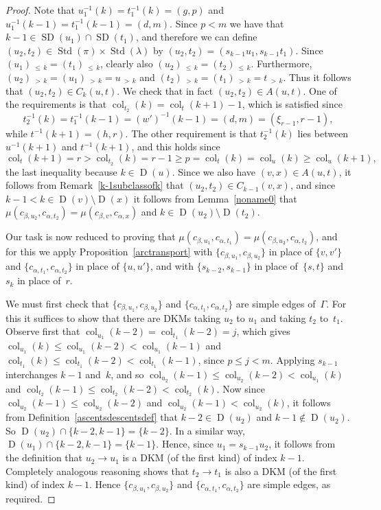 \documentclass[ALCO,ThmDefs,Unicode,epreuves]{cedram}
\DeclareMathOperator{\col}{col}
\newcommand{\morethan}[2]{#1\,{_{>\,#2}}}
\newcommand{\Lessthan}[2]{#1\,{_{\leqslant\,#2}}}
\DeclareMathOperator{\STD}{Std}
\DeclareMathOperator{\SD}{SD}
\DeclareMathOperator{\D}{D}
\begin{document}
\begin{proof}
Note that $u_1^{-1}(k)=t_1^{-1}(k)=(g,p)$ and $u_1^{-1}(k-1)=t_1^{-1}(k-1)=(d,m)$.
Since $p<m$ we have that $k-1\in\SD(u_1)\cap\SD(t_1)$, and therefore we can define
$(u_2,t_2)\in\STD(\pi)\times\STD(\lambda)$ by $(u_2,t_2)=(s_{k-1}u_1,s_{k-1}t_1)$.
Since $\Lessthan{(u_1)}k=\Lessthan{(t_1)}k$, clearly also
$\Lessthan{(u_2)}k=\Lessthan{(t_2)}k$. Furthermore,
$\morethan{(u_2)}k=\morethan{(u_1)}k=\morethan uk$ and
$\morethan{(t_2)}k=\morethan{(t_1)}k=\morethan tk$. Thus it follows that
$(u_2,t_2)\in C_k(u,t)$. We check that in fact $(u_2,t_2)\in A(u,t)$. One of the
requirements is that $\col_{t_2}(k)=\col_t(k+1)-1$, which is satisfied
since
\[
t_2^{-1}(k)=t_1^{-1}(k-1)=(w')^{-1}(k-1)=(d,m)=(\xi_{r-1},r-1),
\]
while $t^{-1}(k+1)=(h,r)$. The other requirement is that $t_2^{-1}(k)$ lies
between $u^{-1}(k+1)$ and $t^{-1}(k+1)$, and this holds since
\[
\col_t(k+1)=r>\col_{t_2}(k)=r-1\geqslant p=\col_t(k)=\col_u(k)\geqslant\col_u(k+1),
\]
the last inequality because $k\in\D(u)$. Since we also have $(v,x)\in A(u,t)$,
it follows from Remark~\ref{k-1subclassofk} that $(u_2,t_2)\in C_{k-1}(v,x)$,
and since $k-1<k\in\D(v)\setminus\D(x)$ it follows from Lemma~\ref{noname0}
that $\mu(c_{\beta,u_2},c_{\alpha,t_2})=\mu(c_{\beta,v},c_{\alpha,x})$
and $k\in\D(u_2)\setminus\D(t_2)$.

Our task is now reduced to proving that
$\mu(c_{\beta,u_1},c_{\alpha,t_1})=\mu(c_{\beta,u_2},c_{\alpha,t_2})$,
and for this we apply Proposition~\ref{arctransport} with
$\{c_{\beta,u_1},c_{\beta,u_2}\}$ in place of $\{v,v'\}$ and
$\{c_{\alpha,t_1},c_{\alpha,t_2}\}$ in place of $\{u,u'\}$, and with
$\{s_{k-2},s_{k-1}\}$ in place of~$\{s,t\}$ and $s_k$ in place of~$r$.

We must first check that $\{c_{\beta,u_1},c_{\beta,u_2}\}$ and
$\{c_{\alpha,t_1},c_{\alpha,t_2}\}$ are simple edges of~$\Gamma$. For this
it suffices to show that there are DKMs taking $u_2$ to $u_1$ and
taking $t_2$ to~$t_1$. Observe first that
$\col_{u_1}(k-2)=\col_{t_1}(k-2)=j$, which gives
$\col_{u_1}(k)\leqslant\col_{u_1}(k-2)<\col_{u_1}(k-1)$ and
$\col_{t_1}(k)\leqslant\col_{t_1}(k-2)<\col_{t_1}(k-1)$,
since $p\leqslant j<m$. Applying $s_{k-1}$ interchanges $k-1$ and~$k$,
and so
$\col_{u_2}(k-1)\leqslant\col_{u_2}(k-2)<\col_{u_1}(k)$ and
$\col_{t_2}(k-1)\leqslant\col_{t_2}(k-2)<\col_{t_2}(k)$.
Now since $\col_{u_2}(k-1)\leqslant\col_{u_2}(k-2)$ and $\col_{u_2}(k-1)<\col_{u_2}(k)$,
it follows from Definition~\ref{ascentsdescentsdef} that $k-2\in\D(u_2)$
and $k-1\notin\D(u_2)$. So $\D(u_2)\cap \{k-2,k-1\}=\{k-2\}$. In a similar
way, $\D(u_1)\cap \{k-2,k-1\}=\{k-1\}$. Hence, since $u_1=s_{k-1}u_2$, it follows
from the definition that $u_2\to u_1$ is a DKM (of the first kind) of index $k-1$.
Completely analogous reasoning shows that $t_2\to t_1$ is also a DKM (of the
first kind) of index $k-1$. Hence $\{c_{\beta,u_1},c_{\beta,u_2}\}$ and
$\{c_{\alpha,t_1},c_{\alpha,t_2}\}$ are simple edges, as required.


\end{proof}
\end{document}
